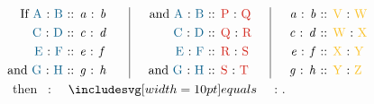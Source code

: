 \documentclass[11pt,preview]{standalone}
\begin{document}
\begin{center}
    $\begin{array}{l | c | r}
            \begin{aligned}
                \text{If \blueA\ : \blueB\ }  & \text{:: \textit{a}\ : \textit{b} \quad} \\
                \text{\blueC\ : \blueD\ }     & \text{:: \textit{c}\ : \textit{d} \quad} \\
                \text{\blueE\ : \blueF\ }     & \text{:: \textit{e}\ : \textit{f} \quad} \\
                \text{and \blueG\ : \blueH\ } & \text{:: \textit{g}\ : \textit{h} \quad} \\
            \end{aligned} &
            \begin{aligned}
                \text{\quad and \blueA\ : \blueB\ } & \text{:: \redP\ : \redQ \quad} \\
                \text{\quad \blueC\ : \blueD\ }     & \text{:: \redQ\ : \redR \quad} \\
                \text{\quad \blueE\ : \blueF\ }     & \text{:: \redR\ : \redS \quad} \\
                \text{\quad and \blueG\ : \blueH\ } & \text{:: \redS\ : \redT \quad} \\
            \end{aligned}                             &
            \begin{aligned}
                \text{\quad \textit{a}\ : \textit{b}\ } & \text{:: \yellowV\ : \yellowW} \\
                \text{\quad \textit{c}\ : \textit{d}\ } & \text{:: \yellowW\ : \yellowX} \\
                \text{\quad \textit{e}\ : \textit{f}\ } & \text{:: \yellowX\ : \yellowY} \\
                \text{\quad \textit{g}\ : \textit{h}\ } & \text{:: \yellowY\ : \yellowZ} \\
            \end{aligned}
        \end{array}$\\
    \qquad \ \ then \redP\ : \redT\ $\bequals$ \yellowV\ : \yellowZ.
\end{center}
\end{document}
